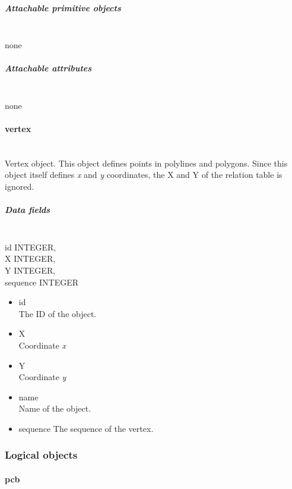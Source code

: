\documentclass[12pt]{article}
\begin{document}
\subparagraph{Attachable primitive
objects}\label{attachable-primitive-objects-5}

\mbox{}\\

none

\subparagraph{Attachable attributes}\label{attachable-attributes-5}

\mbox{}\\

none

\paragraph{vertex}\label{vertex}

\mbox{}\\

Vertex object. This object defines points in polylines and polygons.
Since this object itself defines \emph{x} and \emph{y} coordinates, the
X and Y of the relation table is ignored.

\subparagraph{Data fields}\label{data-fields-6}

\mbox{}\\

id INTEGER,\\
X INTEGER,\\
Y INTEGER,\\
sequence INTEGER

\begin{itemize}
\item
  id\\The ID of the object.
\item
  X\\Coordinate \emph{x}
\item
  Y\\Coordinate \emph{y}
\item
  name\\Name of the object.
\item
  sequence The sequence of the vertex.
\end{itemize}

\subsubsection{Logical objects}\label{logical-objects}

\paragraph{pcb}\label{pcb}
\end{document}
